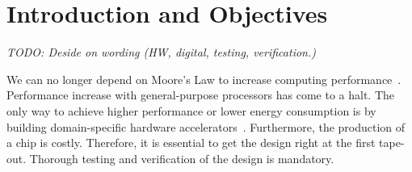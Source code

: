 \documentclass[fleqn,12pt]{article}
\newcommand{\todo}[1]{{\it TODO: #1}}
\begin{document}
%
%
%
%
%

\section{Introduction and Objectives}
\label{sec:objectives}

\todo{Deside on wording (HW, digital, testing, verification.)}


We can no longer depend on Moore's Law to increase computing performance~\cite{dark-silicon:2011}.
Performance increase with general-purpose processors has come to a halt.
The only way to achieve higher performance or lower energy consumption
is by building domain-specific hardware accelerators~\cite{domain-hw-acc:2020}.
Furthermore, the production of a chip is costly. Therefore, it is essential to get the design right at the first tape-out. Thorough testing and verification of the design is mandatory.
\end{document}
